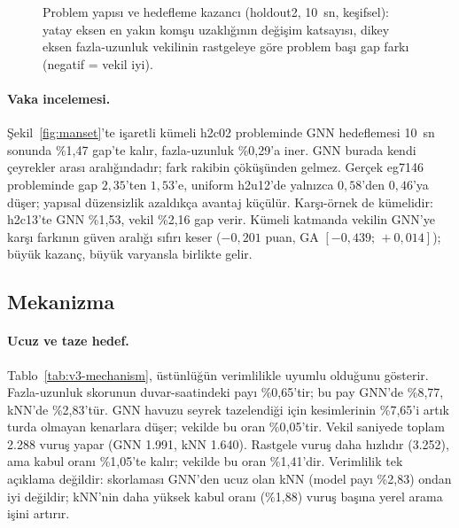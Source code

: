 \begin{figure}[!htbp]
\centering

\caption{Problem yapısı ve hedefleme kazancı (holdout2, 10~sn, keşifsel): yatay eksen en yakın komşu uzaklığının değişim katsayısı, dikey eksen fazla-uzunluk vekilinin rastgeleye göre problem başı gap farkı (negatif = vekil iyi).}
\label{fig:v4-structure}
\end{figure}



\paragraph{Vaka incelemesi.}
Şekil~\ref{fig:manset}'te işaretli kümeli h2c02 probleminde GNN hedeflemesi 10~sn sonunda \%1,47 gap'te kalır, fazla-uzunluk \%0,29'a iner.
GNN burada kendi çeyrekler arası aralığındadır; fark rakibin çöküşünden
gelmez. Gerçek eg7146
probleminde gap $2{,}35$'ten $1{,}53$'e, uniform h2u12'de yalnızca $0{,}58$'den $0{,}46$'ya
düşer; yapısal düzensizlik azaldıkça avantaj küçülür.
Karşı-örnek de kümelidir: h2c13'te GNN \%1,53, vekil \%2,16 gap verir.
Kümeli katmanda vekilin GNN'ye karşı farkının güven aralığı sıfırı keser ($-0{,}201$ puan, GA
$[-0{,}439;\,+0{,}014]$); büyük kazanç, büyük varyansla birlikte gelir.

\subsection{Mekanizma}\label{sec:bulgular-mekanizma}

\paragraph{Ucuz ve taze hedef.}
Tablo~\ref{tab:v3-mechanism}, üstünlüğün verimlilikle uyumlu olduğunu gösterir.
Fazla-uzunluk skorunun duvar-saatindeki payı \%0,65'tir; bu pay GNN'de \%8,77, kNN'de
\%2,83'tür.
GNN havuzu seyrek tazelendiği için kesimlerinin \%7,65'i artık turda olmayan kenarlara düşer;
vekilde bu oran \%0,05'tir.
Vekil saniyede toplam 2.288 vuruş yapar (GNN 1.991, kNN 1.640).
Rastgele vuruş daha hızlıdır (3.252), ama kabul oranı \%1,05'te kalır; vekilde bu oran
\%1,41'dir.
Verimlilik tek açıklama değildir: skorlaması GNN'den ucuz olan kNN (model payı \%2,83) ondan iyi
değildir; kNN'nin daha yüksek kabul oranı (\%1,88) vuruş başına yerel arama işini artırır.

